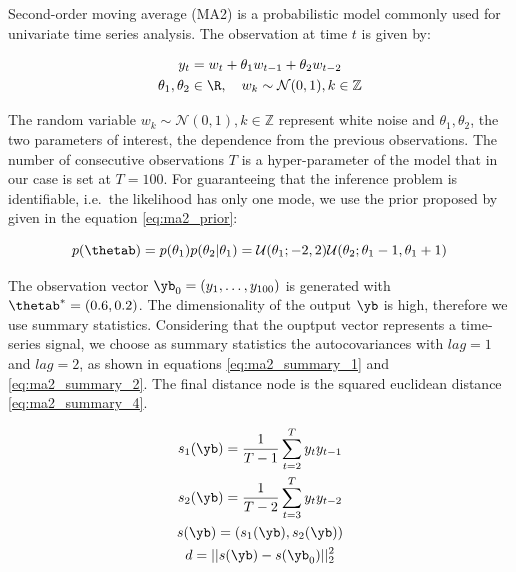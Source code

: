 Second-order moving average (MA2) is a probabilistic model commonly
used for univariate time series analysis. The observation at time $t$
is given by:

\begin{gather} \label{eq:ma2}
y_t = w_t + \theta_1 w_{t-1} + \theta_2 w_{t-2}\\
\theta_1, \theta_2 \in \R, \quad  w_k \sim \mathcal{N}(0,1), k \in \mathbb{Z}
\end{gather}

\noindent
The random variable $w_{k} \sim \mathcal{N}(0,1), k \in \mathbb{Z}$
represent white noise and $\theta_1, \theta_2$, the two parameters of
interest, the dependence from the previous observations. The number of
consecutive observations $T$ is a hyper-parameter of the model that in
our case is set at $T=100$. For guaranteeing that the inference
problem is identifiable, i.e.\ the likelihood has only one mode, we
use the prior proposed by \cite{Marin2012} given in the equation
\eqref{eq:ma2_prior}:

\begin{equation} \label{eq:ma2_prior}
p(\thetab) = p(\theta_1)p(\theta_2|\theta_1)
= \mathcal{U}(\theta_1;-2,2)\mathcal{U}(\theta_2;\theta_1-1, \theta_1+1)
\end{equation}


\noindent
The observation vector $\yb_0 = (y_1, \ldots, y_{100})$ is generated
with $\thetab^*=(0.6, 0.2)$. The dimensionality of the output $\yb$ is
high, therefore we use summary statistics. Considering that the
ouptput vector represents a time-series signal, we choose as summary
statistics the autocovariances with $lag=1$ and $lag=2$, as shown in
equations \eqref{eq:ma2_summary_1} and \eqref{eq:ma2_summary_2}. The
final distance node is the squared euclidean
distance \eqref{eq:ma2_summary_4}.

\begin{gather} \label{eq:ma2_summary_1}
  s_1(\yb) = \frac{1}{T-1} \sum_{t=2}^T y_ty_{t-1}\\ \label{eq:ma2_summary_2}
  s_2(\yb) = \frac{1}{T-2} \sum_{t=3}^T y_ty_{t-2} \\
  s(\yb) = (s_1(\yb), s_2(\yb))\\ \label{eq:ma2_summary_4}
  d = ||s(\yb) - s(\yb_0)||_2^2 
\end{gather}

